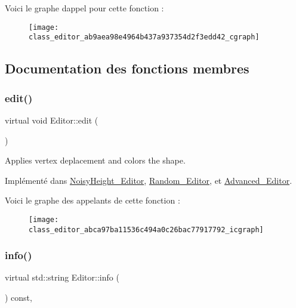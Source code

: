 Voici le graphe d\textquotesingle{}appel pour cette fonction \+:\nopagebreak
\begin{figure}[H]
\begin{center}
\leavevmode
\texttt{[image: class\_editor\_ab9aea98e4964b437a937354d2f3edd42\_cgraph]}
\end{center}
\end{figure}


\subsection{Documentation des fonctions membres}
\mbox{\label{class_editor_abca97ba11536c494a0c26bac77917792}} 
\subsubsection{\texorpdfstring{edit()}{edit()}}
{\footnotesize\ttfamily virtual void Editor\+::edit (\begin{DoxyParamCaption}{ }\end{DoxyParamCaption})\hspace{0.3cm}{\ttfamily [pure virtual]}}



Applies vertex deplacement and colors the shape. 



Implémenté dans \hyperlink{class_noisy_height___editor_a3ed5c7267dec56ff2f21366ce2ae9818}{Noisy\+Height\+\_\+\+Editor}, \hyperlink{class_random___editor_abea41199b1502f89be0b2914b3c191fc}{Random\+\_\+\+Editor}, et \hyperlink{class_advanced___editor_afc51cb1199403cb6785bfd3d7e290a1b}{Advanced\+\_\+\+Editor}.

Voici le graphe des appelants de cette fonction \+:\nopagebreak
\begin{figure}[H]
\begin{center}
\leavevmode
\texttt{[image: class\_editor\_abca97ba11536c494a0c26bac77917792\_icgraph]}
\end{center}
\end{figure}
\mbox{\label{class_editor_a5747cd74b71d67f6d39b094071058382}} 
\subsubsection{\texorpdfstring{info()}{info()}}
{\footnotesize\ttfamily virtual std\+::string Editor\+::info (\begin{DoxyParamCaption}{ }\end{DoxyParamCaption}) const\hspace{0.3cm}{\ttfamily [inline]}, {\ttfamily [virtual]}}



